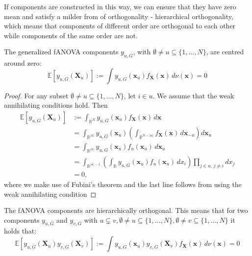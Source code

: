 If components are constructed in this way, we can ensure that they have zero mean and satisfy a milder from of orthogonality - hierarchical orthogonality, which means that components of different order are orthogonal to each other while components of the same order are not.
\begin{proposition}
    The generalized fANOVA components $y_{u, G}$, with $\emptyset \neq u \subseteq \{1, \ldots, N\}$, are centred around zero:
\begin{equation}
    \mathbb{E}[y_{u, G}(\boldsymbol{X}_u)] := \int y_{u, G}(\boldsymbol{x}_u) f_{\boldsymbol{X}}(\boldsymbol{x}) \, d\nu (\boldsymbol{x}) = 0
    \label{eq:zero_mean_g}
\end{equation}
\end{proposition}

\begin{proof}
For any subset $\emptyset \ne u \subseteq \{1, \ldots, N\}$, let $i \in u$. We assume that the weak annihilating conditions hold. Then
\begin{align*}
\mathbb{E}[y_{u,G}(\mathbf{X}_u)] 
&:= \int_{\mathbb{R}^N} y_{u,G}(\mathbf{x}_u) f_{\mathbf{X}}(\mathbf{x})\, d\mathbf{x} \\
&= \int_{\mathbb{R}^{|u|}} y_{u,G}(\mathbf{x}_u) \left( \int_{\mathbb{R}^{N - |u|}} f_{\mathbf{X}}(\mathbf{x}) \, d\mathbf{x}_{-u} \right) d\mathbf{x}_u \\
&= \int_{\mathbb{R}^{|u|}} y_{u,G}(\mathbf{x}_u) f_u(\mathbf{x}_u)\, d\mathbf{x}_u \\
&= \int_{\mathbb{R}^{|u| - 1}} \left( \int_{\mathbb{R}} y_{u,G}(\mathbf{x}_u) f_u(\mathbf{x}_u) \, dx_i \right) \prod_{j \in u,\, j \ne i} dx_j \\
&= 0,
\end{align*}
where we make use of Fubini's theorem and the last line follows from using the weak annihilating condition %
\end{proof}

\begin{proposition}
    The fANOVA components are hierarchically orthogonal. This means that for two components $y_{u, G}$ and $y_{v, G}$ with $u \subsetneq v, \emptyset \neq u \subseteq \{1, \ldots, N\}, \emptyset \neq v \subseteq \{1, \ldots, N\} $ it holds that:
\begin{equation}
    \mathbb{E}[y_{u, G}(\boldsymbol{X}_u)y_{v, G}(\boldsymbol{X}_v)] := \int y_{u, G}(\boldsymbol{x}_u) y_{v, G}(\boldsymbol{X}_v) f_{\boldsymbol{X}}(\boldsymbol{x}) \, d\nu (\boldsymbol{x}) = 0
\end{equation}
\label{eq:orthogonality_g}
\end{proposition}

